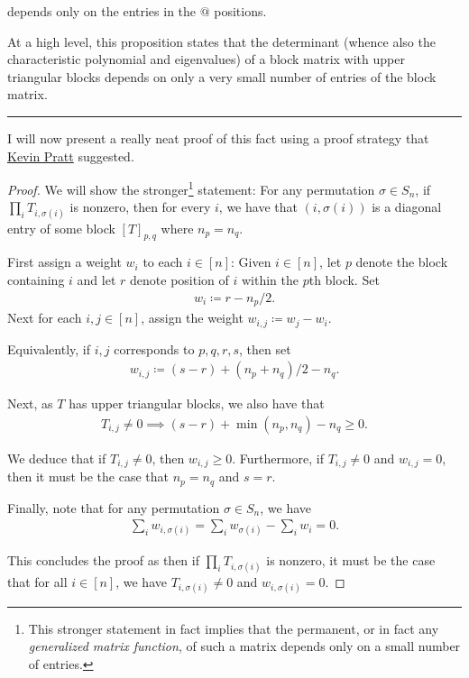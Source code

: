 \documentclass{article}
\begin{document}
depends only on the entries in the $@$ positions.


At a high level, this proposition states that the determinant (whence also the characteristic polynomial and eigenvalues) of a block matrix with upper triangular blocks depends on only a very small number of entries of the block matrix.

\rule{0.5\linewidth}{\linethickness}

I will now present a really neat proof of this fact using a proof strategy that \href{http://www.cs.cmu.edu/~kpratt/}{Kevin Pratt} suggested.

\begin{proof}
We will show the stronger\footnote{This stronger statement in fact implies that the permanent, or in fact any \textit{generalized matrix function}, of such a matrix depends only on a small number of entries.} statement: For any permutation $\sigma \in S_n$, if $\prod_i T_{i,\sigma(i)}$ is nonzero, then for every $i$, we have that $(i,\sigma(i))$ is a diagonal entry of some block $[T]_{p,q}$ where $n_p = n_q$.

First assign a weight $w_i$ to each $i\in[n]$: Given $i\in[n]$, let $p$ denote the block containing $i$ and let $r$ denote position of $i$ within the $p$th block. Set
\begin{align*}
w_i \coloneqq r - n_p/2.
\end{align*}
Next for each $i,j\in[n]$, assign the weight $w_{i,j}\coloneqq w_j - w_i$.

Equivalently, if $i,j$ corresponds to $p,q,r,s$, then set
\begin{align*}
w_{i,j} \coloneqq (s- r) + (n_p + n_q)/2 - n_q.
\end{align*}

Next, as $T$ has upper triangular blocks, we also have that
\begin{align*}
T_{i,j}\neq 0 \implies (s-r) + \min(n_p,n_q) - n_q\geq 0.
\end{align*}

We deduce that if $T_{i,j}\neq 0$, then $w_{i,j}\geq 0$. Furthermore, if $T_{i,j}\neq 0$ and $w_{i,j} = 0$, then it must be the case that $n_p = n_q$ and $s = r$.


Finally, note that for any permutation $\sigma\in S_n$, we have
\begin{align*}
\sum_{i} w_{i,\sigma(i)} = \sum_i w_{\sigma(i)} - \sum_i w_i = 0.
\end{align*}

This concludes the proof as then if $\prod_i T_{i,\sigma(i)}$ is nonzero, it must be the case that for all $i\in[n]$, we have $T_{i,\sigma(i)}\neq 0$ and $w_{i,\sigma(i)} = 0$.
\end{proof}
\end{document}
